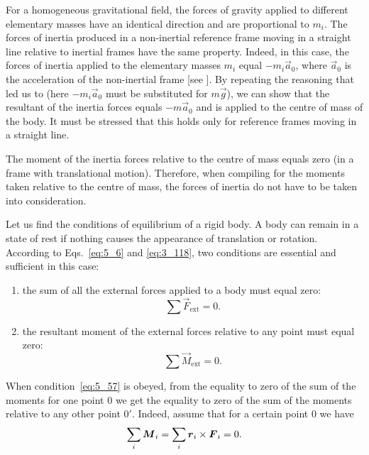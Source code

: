 For a homogeneous gravitational field, the forces of gravity applied to different elementary masses have an identical direction and are proportional to $m_i$. The forces of inertia produced in a non-inertial reference frame moving in a straight line relative to inertial frames have the same property. Indeed, in this case, the forces of inertia applied to the elementary masses $m_i$ equal $-m_i\vec{a}_0$, where $\vec{a}_0$ is the acceleration of the non-inertial frame [see ]. By repeating the reasoning that led us to  (here $-m_i\vec{a}_0$ must be substituted for $m\vec{g}$), we can show that the resultant of the inertia forces equals $-m\vec{a}_0$ and is applied to the centre of mass of the body. It must be stressed that this holds only for reference frames moving in a straight line.

The moment of the inertia forces relative to the centre of mass equals zero (in a frame with translational motion). Therefore, when compiling  for the moments taken relative to the centre of mass, the forces of inertia do not have to be taken into consideration.

Let us find the conditions of equilibrium of a rigid body. A body can remain in a state of rest if nothing causes the appearance of translation or rotation. According to Eqs.~\eqref{eq:5_6} and \eqref{eq:3_118}, two conditions are essential and sufficient in this case:
\begin{enumerate}[(1)]
	\item the sum of all the external forces applied to a body must equal zero:
	\begin{equation}\label{eq:5_57}
		\sum\vec{F}_{\text{ext}} = 0.
	\end{equation}

	\item the resultant moment of the external forces relative to any point must equal zero:
	\begin{equation}\label{eq:5_58}
		\sum\vec{M}_{\text{ext}} = 0.
	\end{equation}
\end{enumerate}

When condition~\eqref{eq:5_57} is obeyed, from the equality to zero of the sum of the moments for one point $0$ we get the equality to zero of the sum of the moments relative to any other point $0'$. Indeed, assume that for a certain point $0$ we have
\begin{equation}\label{eq:5_59}
	\sum_i\boldsymbol{M}_{i} = \sum_i\boldsymbol{r}_{i}\times\boldsymbol{F}_{i} = 0.
\end{equation}

